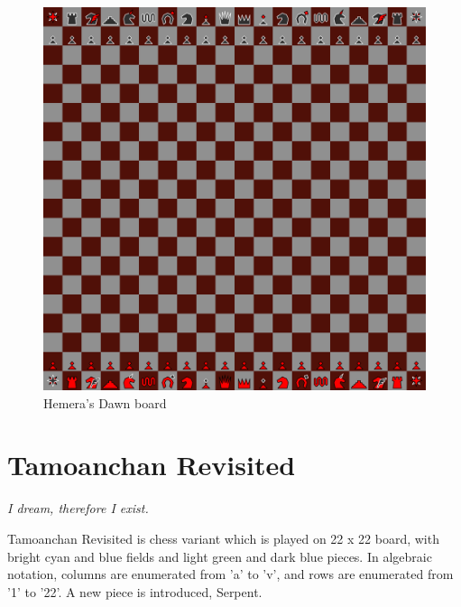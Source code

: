 \documentclass[a5paper,12pt,draft]{book} %
\begin{document}
\noindent
\begin{figure}[h]
\includegraphics[width=1.0\textwidth, keepaspectratio=true]{../gfx/boards/14_hemera_s_dawn.png}
\caption{Hemera's Dawn board}
\label{fig:hemera_s_dawn}
\end{figure}

\clearpage

\chapter*{Tamoanchan Revisited}

\begin{flushright}
\parbox{0.6\textwidth}{
\emph{I dream, therefore I exist. \\
 } }
\end{flushright}

Tamoanchan Revisited is chess variant which is played on 22 x 22 board,
with bright cyan and blue fields and light green and dark blue pieces.
In algebraic notation, columns are enumerated from 'a' to 'v', and rows
are enumerated from '1' to '22'. A new piece is introduced, Serpent.
\end{document}
